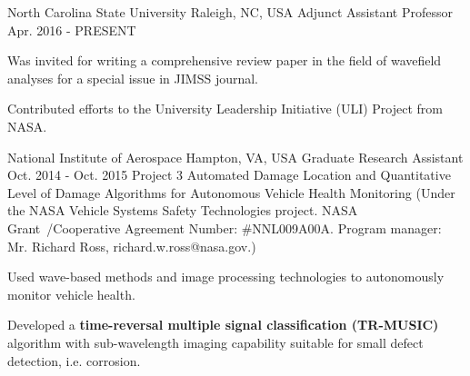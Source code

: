 \begin{cventries}
 \cventryprojtrued
    {North Carolina State University} %
    {Raleigh, NC, USA} %
    {Adjunct Assistant Professor} %
    {Apr. 2016 - PRESENT} %
    {     
     \begin{cvitems} %
       \item {Was invited for writing a comprehensive review paper in the field of wavefield analyses for a special issue in JIMSS journal.}
       \item {Contributed efforts to the University Leadership Initiative (ULI) Project from NASA.}
      \end{cvitems}
         }

  \cventryprojtrueb
    {National Institute of Aerospace} %
    {Hampton, VA, USA} %
    {Graduate Research Assistant} %
    {Oct. 2014 - Oct. 2015} %
    {Project 3} %
    {{Automated Damage Location and Quantitative Level of Damage Algorithms for Autonomous Vehicle Health Monitoring} (Under the NASA Vehicle Systems Safety Technologies project. NASA Grant\ /Cooperative Agreement Number: \#NNL009A00A. Program manager: Mr. Richard Ross, richard.w.ross@nasa.gov.)}
    {     
     \begin{cvitems} %
       \item {Used wave-based methods and image processing technologies to autonomously monitor vehicle health.}
       \item {Developed a \textbf{time-reversal multiple signal classification (TR-MUSIC)} algorithm with sub-wavelength imaging capability suitable for small defect detection, i.e. corrosion. }
      \end{cvitems}
         }


\end{cventries}
